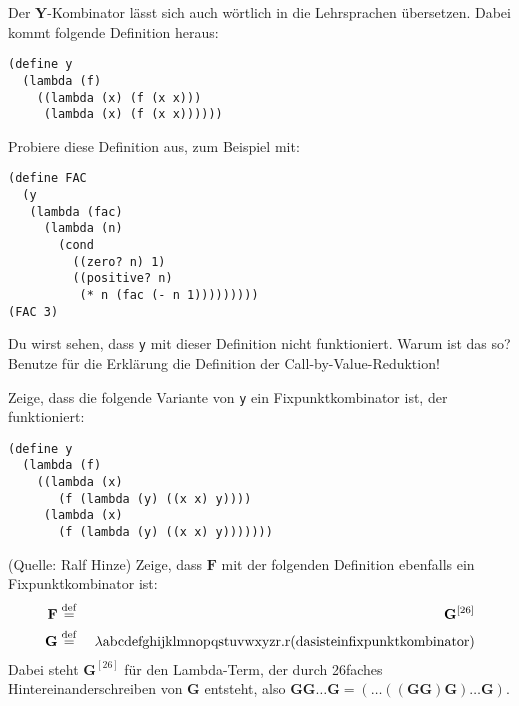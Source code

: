 \begin{aufgabe}
  Der $\mathbf{Y}$-Kombinator lässt sich auch wörtlich in die
  Lehrsprachen übersetzen.  Dabei kommt folgende Definition heraus:
\begin{lstlisting}
(define y 
  (lambda (f)
    ((lambda (x) (f (x x)))
     (lambda (x) (f (x x))))))
\end{lstlisting}
  Probiere diese Definition aus, zum Beispiel mit:
\begin{lstlisting}
(define FAC
  (y
   (lambda (fac)
     (lambda (n)
       (cond
         ((zero? n) 1)
         ((positive? n)
          (* n (fac (- n 1)))))))))
(FAC 3)
\end{lstlisting}
  Du wirst sehen, dass \texttt{y} mit dieser Definition nicht
  funktioniert.  Warum ist das so?  Benutze für die Erklärung die
  Definition der Call-by-Value-Reduktion!

  Zeige, dass die folgende Variante von \texttt{y} ein
  Fixpunktkombinator ist, der funktioniert:
\begin{lstlisting}
(define y
  (lambda (f)
    ((lambda (x)
       (f (lambda (y) ((x x) y))))
     (lambda (x)
       (f (lambda (y) ((x x) y)))))))
\end{lstlisting}

\end{aufgabe}
\begin{aufgabe} (Quelle: Ralf Hinze)
  Zeige, dass $\mathbf{F}$ mit der folgenden Definition ebenfalls ein
  Fixpunktkombinator ist:
  \begin{eqnarray*}
    \mathbf{F} &\stackrel{\rm def}{=}{}& \mathbf{G}^{[26]}
    \\
    \mathbf{G} &\stackrel{\rm def}{=}{}& \lambda \mathrm a\mathrm b\mathrm c\mathrm d\mathrm e\mathrm f\mathrm g\mathrm h\mathrm i\mathrm j\mathrm k\mathrm l\mathrm m\mathrm n\mathrm o\mathrm p\mathrm q\mathrm s\mathrm t\mathrm u\mathrm v\mathrm w\mathrm x\mathrm y\mathrm z\mathrm r.\mathrm r(\mathrm d\mathrm a\mathrm s\mathrm i\mathrm s\mathrm t\mathrm e\mathrm i\mathrm n\mathrm f\mathrm i\mathrm x\mathrm p\mathrm u\mathrm n\mathrm k\mathrm t\mathrm k\mathrm o\mathrm m\mathrm b\mathrm i\mathrm n\mathrm a\mathrm t\mathrm o\mathrm r)
  \end{eqnarray*}
  Dabei steht $\mathbf{G}^{[26]}$ für den Lambda-Term, der durch 26faches
  Hintereinanderschreiben von $\mathbf{G}$ entsteht, also $\mathbf{G}\mathbf{G}\ldots \mathbf{G} = (\ldots
  ((\mathbf{G} \mathbf{G}) \mathbf{G})\ldots \mathbf{G})$.
  

\end{aufgabe}

